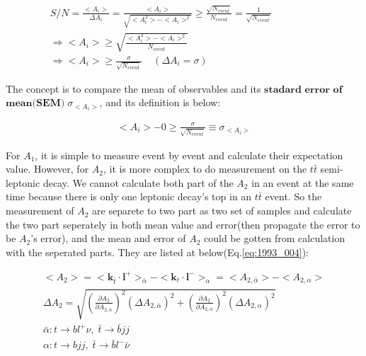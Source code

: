 			\begin{equation}
			\begin{split} 
			S/N = \frac{<A_i>}{\Delta A_i} = \frac{<A_i>}{\sqrt{<A_i^2>-<A_i>^2}} \geq \frac{\sqrt{N_{event}}}{N_{event}} = \frac{1}{\sqrt{N_{event}}} \\
			\Rightarrow <A_i> \geq \sqrt{ \frac{<A_i^2>-<A_i>^2}{N_{event}} } \;\;\;\;\;\;\;\;\;\;\;\;\;\;\;\;\;\;\;\;\;\;\;\;\;\;\;\;\;\;\;\;\;\;\;\;\;\;\;\;\\
			\Rightarrow <A_i> \geq \frac{\sigma}{\sqrt{N_{event}}} \;\;\;\;(\Delta A_i = \sigma)\;\;\;\;\;\;\;\;\;\;\;\;\;\;\;\;\;\;\;\;\;\;\;\;\;\;\;\;\;\;\;\;\;\;\;\;\;\;\;\;
			\end{split}
			\label{eq:signal_noise}
			\end{equation}

			The concept is to compare the mean of observables and its $\textbf{stadard}$ $\textbf{error}$ $\textbf{of}$ $\textbf{mean}$$\textbf{(SEM)}\; \sigma_{<A_{i}>}$, and its definition is below:

			\begin{equation}
			\begin{split} 
			 <A_i> - 0 \geq \frac{\sigma}{\sqrt{N_{event}}} \equiv \sigma_{<A_i>} 
			\end{split}
			\label{eq:signal_noise_2}
			\end{equation}

			For $A_1$, it is simple to measure event by event and calculate their expectation value. However, for $A_2$, it is more complex to do measurement on the $t\bar{t}$ semi-leptonic decay. We cannot calculate both part of the $A_2$ in an event at the same time because there is only one leptonic decay's top in an $t\bar{t}$ event. So the measurement of $A_2$ are separete to two part as two set of samples and calculate the two part seperately in both mean value and error(then propagate the error to be $A_2$'s error), and the mean and error of $A_2$ could be gotten from calculation with the seperated parts. They are listed at below(Eq.\ref{eq:1993_004}):

			\begin{equation}
			\begin{split} 
			<A_2> = <\textbf{k}_{\bar{t}} \cdot \textbf{l}^+>_{\bar{\alpha}} - <\textbf{k}_t \cdot \textbf{l}^->_{\alpha} = <A_{2,\bar{\alpha}}> - <A_{2,\alpha}>\\
			\Delta A_2 = \sqrt{(\frac{\partial A_2}{\partial A_{2,\bar{\alpha}}})^2 (\Delta A_{2,\bar{\alpha}})^2 + (\frac{\partial A_2}{\partial A_{2,\alpha}})^2 (\Delta A_{2,\alpha})^2} \;\;\;\;\;\;\;\;\;\;\;\;\;\;\;\;\;\\
			\bar{\alpha} : t\rightarrow bl^+\nu,\; \bar{t}\rightarrow \bar{b}jj   \;\;\;\;\;\;\;\;\;\;\;\;\;\;\;\;\;\;\;\;\;\;\;\;\;\;\;\;\;\;\;\;\;\;\;\;\;\;\;\;\;\;\;\;\;\;\;\;\;\;\;\;\;\;\;\; \\
			\alpha : t\rightarrow bjj,\; \bar{t}\rightarrow \bar{b} l^- \bar{\nu} \;\;\;\;\;\;\;\;\;\;\;\;\;\;\;\;\;\;\;\;\;\;\;\;\;\;\;\;\;\;\;\;\;\;\;\;\;\;\;\;\;\;\;\;\;\;\;\;\;\;\;\;\;\;\;\;
			\end{split}
			\label{eq:1993_004}
			\end{equation}

